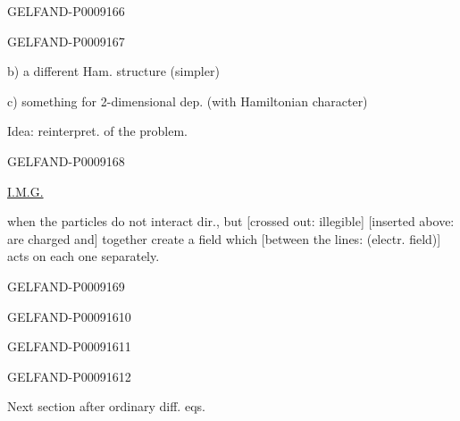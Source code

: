 \begin{GelfandAdjacentEvidence}{GELFAND-P000916}{6}

\end{GelfandAdjacentEvidence}
\begin{GelfandAdjacentEvidence}{GELFAND-P000916}{7}


b) a different Ham. structure (simpler)

c) something for 2-dimensional dep. (with Hamiltonian character)

Idea: reinterpret. of the problem.
\end{GelfandAdjacentEvidence}
\begin{GelfandAdjacentEvidence}{GELFAND-P000916}{8}


\uline{I.M.G.}\quad {}

when the particles do not interact dir., but
[crossed out: illegible]
[inserted above: are charged and] together create a field which
[between the lines: (electr. field)]
acts on each one separately.

\end{GelfandAdjacentEvidence}
\begin{GelfandAdjacentEvidence}{GELFAND-P000916}{9}

\end{GelfandAdjacentEvidence}
\begin{GelfandAdjacentEvidence}{GELFAND-P000916}{10}

\end{GelfandAdjacentEvidence}
\begin{GelfandAdjacentEvidence}{GELFAND-P000916}{11}

\end{GelfandAdjacentEvidence}
\begin{GelfandAdjacentEvidence}{GELFAND-P000916}{12}


Next section after ordinary diff. eqs.
\end{GelfandAdjacentEvidence}



